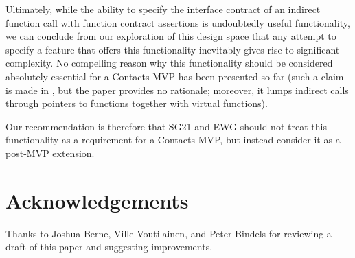 Ultimately, while the ability to specify the interface contract of an indirect function call with function contract assertions is undoubtedly useful functionality, we can conclude from our exploration of this design space that any attempt to specify a feature that offers this functionality inevitably gives rise to significant complexity. No compelling reason why this functionality should be considered absolutely essential for a Contacts MVP has been presented so far (such a claim is  made in \cite{P3173R0}, but the paper provides no rationale; moreover, it lumps indirect calls through pointers to functions together with virtual functions).

Our recommendation is therefore that SG21 and EWG should not treat this functionality as a requirement for a Contacts MVP, but instead consider it as a post-MVP extension.



\section*{Acknowledgements}
Thanks to Joshua Berne, Ville Voutilainen, and Peter Bindels for reviewing a draft of this paper and suggesting improvements.




\renewcommand{\addcontentsline}[3]{}%







